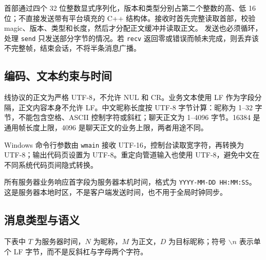 \documentclass[UTF8,notitlepage,11pt]{ctexart}
\newcommand{\src}[1]{\nolinkurl{#1}}
\begin{document}
首部通过四个 32 位整数显式序列化，版本和类型分别占第二个整数的高、低 16 位；不直接发送带有平台填充的 C++ 结构体。接收时首先完整读取首部，校验 magic、版本、类型和长度，然后才分配正文缓冲并读取正文。
发送也必须循环，处理 \src{send} 只发送部分字节的情况。若 \src{recv} 返回零或错误而帧未完成，则丢弃该不完整帧，结束会话，不将半条消息广播。

\subsection{编码、文本约束与时间}
线协议的正文为严格 UTF-8，不允许 NUL 和 CR。业务文本使用 LF 作为字段分隔，正文内容本身不允许 LF。中文昵称长度按 UTF-8 字节计算：昵称为 1--32 字节，不能包含空格、ASCII 控制字符或斜杠；聊天正文为 1--4096 字节。16384 是通用帧长度上限，4096 是聊天正文的业务上限，两者用途不同。

Windows 命令行参数由 \src{wmain} 接收 UTF-16，控制台读取宽字符，再转换为 UTF-8；输出代码页设置为 UTF-8。重定向管道输入也使用 UTF-8，避免中文在不同系统代码页间隐式转换。

所有服务器业务响应首字段为服务器本机时间，格式为 \src{YYYY-MM-DD HH:MM:SS}。这是服务器本地时区，不是客户端发送时间，也不用于全局时钟同步。

\subsection{消息类型与语义}
下表中 $T$ 为服务器时间，$N$ 为昵称，$M$ 为正文，$D$ 为目标昵称；符号 $\backslash n$ 表示单个 LF 字节，而不是反斜杠与字母两个字符。
\end{document}
